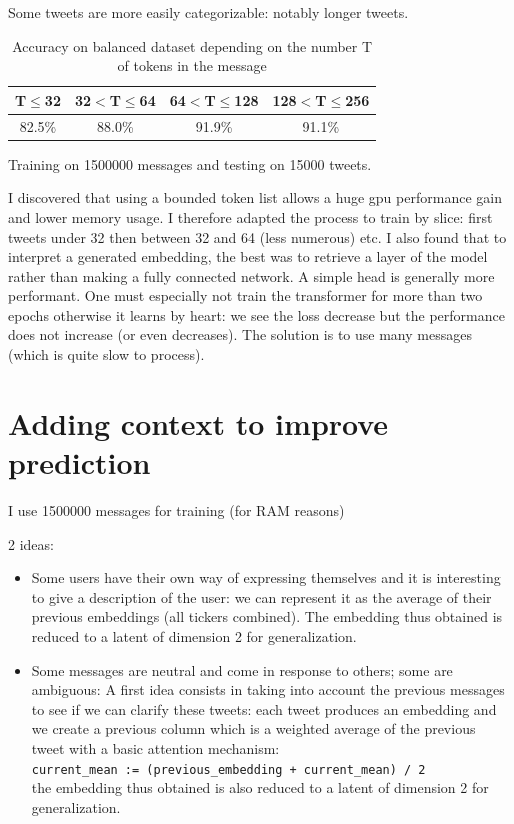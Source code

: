 \documentclass[12pt]{article}
\begin{document}
Some tweets are more easily categorizable: notably longer tweets.


\begin{table}[h]
\caption{Accuracy on balanced dataset depending on the number T of tokens in the message}
\centering
\begin{tabular}{cccc}
\toprule
T$\le$32 & 32$<$T$\le$64 & 64$<$T$\le$128 & 128$<$T$\le$256 \\
\midrule
82.5\% & 88.0\% & 91.9\% & 91.1\% \\
\bottomrule
\end{tabular}

\vspace{2mm}
{\centering \small Training on 1500000 messages and testing on 15000 tweets.\par}

\end{table}


I discovered that using a bounded token list allows a huge gpu performance gain and lower memory usage.
I therefore adapted the process to train by slice: first tweets under 32 then between 32 and 64 (less numerous) etc.
I also found that to interpret a generated embedding, the best was to retrieve a layer of the model rather than making a fully connected network.
A simple head is generally more performant.
One must especially not train the transformer for more than two epochs otherwise it learns by heart: we see the loss decrease but the performance does not increase (or even decreases). The solution is to use many messages (which is quite slow to process).

\section{Adding context to improve prediction}

I use 1500000 messages for training (for RAM reasons)

2 ideas:
\begin{itemize}

    \item Some users have their own way of expressing themselves and it is interesting to give a description of the user: we can represent it as the average of their previous embeddings (all tickers combined). The embedding thus obtained is reduced to a latent of dimension 2 for generalization.
    
    \item Some messages are neutral and come in response to others; some are ambiguous: A first idea consists in taking into account the previous messages to see if we can clarify these tweets: each tweet produces an embedding and we create a previous column which is a weighted average of the previous tweet with a basic attention mechanism:\\
    \texttt{current\_mean := (previous\_embedding + current\_mean) / 2}\\
    the embedding thus obtained is also reduced to a latent of dimension 2 for generalization.

\end{itemize}
\end{document}
